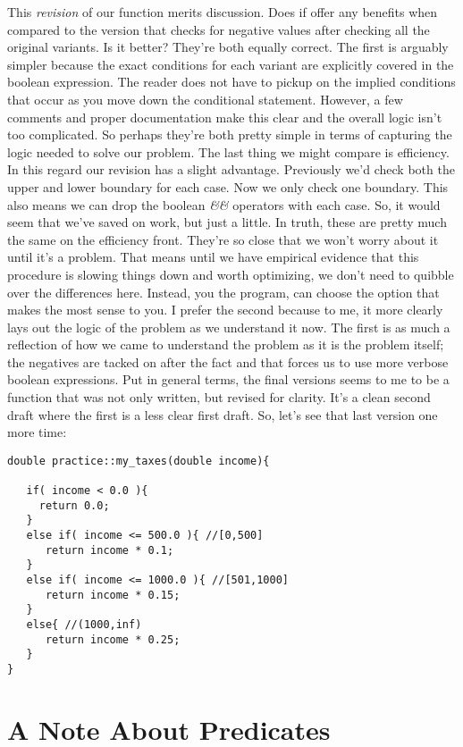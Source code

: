 \documentclass[]{tufte-handout}
\begin{document}
This \textit{revision} of our function merits discussion. Does if offer any benefits when compared to the version that checks for negative values after checking all the original variants. Is it better?  They're both equally correct. The first is arguably simpler because the exact conditions for each variant are explicitly covered in the boolean expression. The reader does not have to pickup on the implied conditions that occur as you move down the conditional statement. However, a few comments and proper documentation make this clear and the overall logic isn't too complicated. So perhaps they're both pretty simple in terms of capturing the logic needed to solve our problem. The last thing we might compare is efficiency. In this regard our revision has a slight advantage. Previously we'd check both the upper and lower boundary for each case. Now we only check one boundary. This also means we can drop the boolean \textit{\&\&} operators with each case. So, it would seem that we've saved on work, but just a little.  In truth, these are pretty much the same on the efficiency front. They're so close that we won't worry about it until it's a problem. That means until we have empirical evidence that this procedure is slowing things down and worth optimizing, we don't need to quibble over the differences here. Instead, you the program, can choose the option that makes the most sense to you. I prefer the second because to me, it more clearly lays out the logic of the problem as we understand it now. The first is as much a reflection of how we came to understand the problem as it is the problem itself; the negatives are tacked on after the fact and that forces us to use more verbose boolean expressions.  Put in general terms, the final versions seems to me to be a function that was not only written, but revised for clarity. It's a clean second draft where the first is a less clear first draft.  So, let's see that last version one more time:

\begin{verbatim}
double practice::my_taxes(double income){

   if( income < 0.0 ){
     return 0.0;
   } 
   else if( income <= 500.0 ){ //[0,500]
      return income * 0.1;
   }
   else if( income <= 1000.0 ){ //[501,1000]
      return income * 0.15;   
   }
   else{ //(1000,inf) 
      return income * 0.25;   
   }
}
\end{verbatim}


\section{A Note About Predicates}
\end{document}
